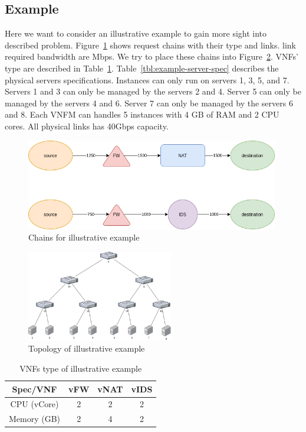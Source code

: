 \subsection{Example}
\par
Here we want to consider an illustrative example to gain more sight into described problem.
Figure~\ref{fig:example-chains} shows request chains with their type and links. link required bandwidth are Mbps.
We try to place these chains into Figure~\ref{fig:example-topology}.
VNFs' type are described in Table~\ref{tbl:example-vnf-types}.
Table~\ref{tbl:example-server-spec} describes the physical servers specifications.
Instances can only run on servers 1, 3, 5, and 7.
Servers 1 and 3 can only be managed by the servers 2 and 4.
Server 5 can only be managed by the servers 4 and 6.
Server 7 can only be managed by the servers 6 and 8.
Each VNFM can handles 5 instances with 4 GB of RAM and 2 CPU cores.
All physical links has 40Gbps capacity.

\begin{figure}
    \centering
    \includegraphics[height=150px]{images/example-chains.png}
    \caption{Chains for illustrative example}
    \label{fig:example-chains}
\end{figure}

\begin{figure}
    \centering
    \includegraphics[height=150px]{images/example-toplogy.png}
    \caption{Topology of illustrative example}
    \label{fig:example-topology}
\end{figure}

\begin{table}
    \centering
    \caption{VNFs type of illustrative example}
    \begin{tabular}{|c|c|c|c|}
        \hline
        Spec/VNF & vFW & vNAT & vIDS \\
        \hline
        CPU (vCore) & 2 & 2 & 2 \\
        \hline
        Memory (GB) & 2 & 4 & 2 \\
        \hline
    \end{tabular}
    \label{tbl:example-vnf-types}
\end{table}

